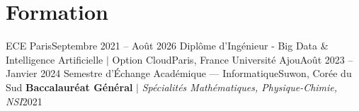 \section{Formation}
  \resumeSubHeadingListStart
    \resumeSubheading
      {ECE Paris}{Septembre 2021 -- Août 2026}
      {Diplôme d'Ingénieur - Big Data \& Intelligence Artificielle $|$ Option Cloud}{Paris, France}
      \vspace{2pt}
    \resumeSubheading
      {Université Ajou}{Août 2023 -- Janvier 2024}
      {Semestre d'Échange Académique — Informatique}{Suwon, Corée du Sud}
      \vspace{2pt}
    \resumeProjectHeading
      {\textbf{Baccalauréat Général} $|$ \textit{Spécialités Mathématiques, Physique-Chimie, NSI}}{2021}
  \resumeSubHeadingListEnd
